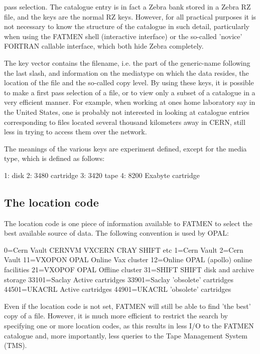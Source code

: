 pass selection. The catalogue entry is in fact a Zebra bank stored
in a Zebra RZ file, and the keys are the normal RZ keys.
However, for all practical purposes it is not necessary to know 
the structure of the catalogue in such detail, particularly when using
the FATMEN shell (interactive interface) or the so-called 'novice'
FORTRAN callable interface, which both hide Zebra completely.
\par
The key vector contains the filename, i.e. the part of the generic-name
following the last slash, and information on the mediatype on which the
data resides, the location of the file and the so-called copy level.
By using these keys, it is possible to make a first pass selection
of a file, or to view only a subset of a catalogue in a very efficient
manner. For example, when working at ones home laboratory say in the United
States, one is probably not interested in looking at catalogue entries
corresponding to files located several thousand kilometers away in
CERN, still less in trying to access them over the network.
\par
{}
The meanings of the various keys are experiment defined, except for the
media type, which is defined as follows:
\begin{XMP}
1: disk
2: 3480 cartridge
3: 3420 tape
4: 8200 Exabyte cartridge
\end{XMP}
\subsection{The location code}
\par
The location code is one piece of information available to FATMEN
to select the best available source of data.
The following convention is used by OPAL:
\begin{XMP}
         0=Cern Vault     CERNVM VXCERN CRAY SHIFT etc      
         1=Cern Vault                                      
         2=Cern Vault                                     
        11=VXOPON         OPAL Online Vax cluster        
        12=Online         OPAL (apollo) online facilities
        21=VXOPOF         OPAL Offline cluster           
        31=SHIFT          SHIFT disk and archive storage
     33101=Saclay         Active cartridges            
     33901=Saclay         'obsolete' cartridges       
     44501=UKACRL         Active cartridges          
     44901=UKACRL         'obsolete' cartridges     
\end{XMP}
\par
Even if the location code is not set, FATMEN will still be able to
find 'the best' copy of a file. However, it is much more efficient
to restrict the search by specifying one or more location codes,
as this results in less I/O to the FATMEN catalogue and, more importantly,
less queries to the Tape Management System (TMS).
